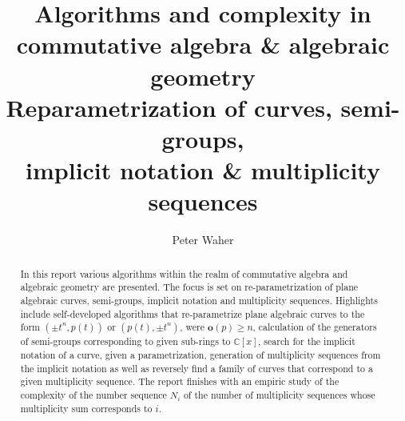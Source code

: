 \documentclass[twoside]{article}
\title{Algorithms and complexity in\\
	commutative algebra \& algebraic geometry \\[20pt]
	\large Reparametrization of curves, semi-groups, \\
	implicit notation \& multiplicity sequences}
\author{Peter Waher}
\begin{document}
\maketitle

\begin{abstract}
In this report various algorithms within the realm of commutative algebra and algebraic geometry are presented. The focus is set on re-parametrization of plane algebraic curves, semi-groups, implicit notation and multiplicity sequences. Highlights include self-developed algorithms that re-parametrize plane algebraic curves to the form $(\pm t^n, p(t))$ or $(p(t), \pm t^n)$, were $\mathbf{o}(p)\geq n$, calculation of the generators of semi-groups corresponding to given sub-rings to $\mathbb{C}[x]$, search for the implicit notation of a curve, given a parametrization, generation of multiplicity sequences from the implicit notation as well as reversely find a family of curves that correspond to a given multiplicity sequence. The report finishes with an empiric study of the complexity of the number sequence $N_i$ of the number of multiplicity sequences whose multiplicity sum corresponds to $i$.
\end{abstract}
\end{document}
